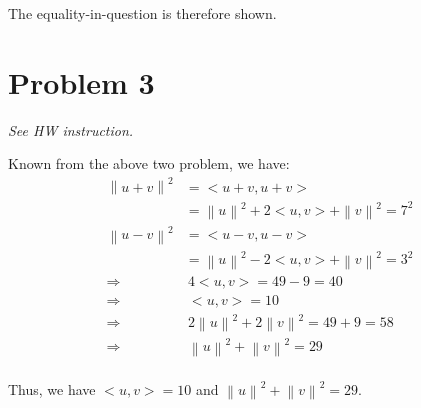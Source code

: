 \documentclass[11pt]{article}
\providecommand{\norm}[1]{\left\lVert #1 \right\rVert}
\begin{document}
The equality-in-question is therefore shown.

\section*{Problem 3}
\textit{See HW instruction.}\newline

Known from the above two problem, we have:
\begin{align*}
    \norm{u + v}^2 &= <u + v, u + v> \\
    &= \norm{u}^2 + 2<u, v> + \norm{v}^2 = 7^2 \\
    \norm{u - v}^2 &= <u - v, u - v> \\
    &= \norm{u}^2 - 2<u, v> + \norm{v}^2 = 3^2 \\
    \Rightarrow& \ 4<u, v> = 49 - 9 = 40 \\
    \Longrightarrow& \ <u, v> = 10 \\
    \Rightarrow& \ 2\norm{u}^2 + 2\norm{v}^2 = 49 + 9 = 58 \\
    \Longrightarrow& \ \norm{u}^2 + \norm{v}^2 = 29 \\
\end{align*}

Thus, we have $<u, v> = 10$ and $\norm{u}^2 + \norm{v}^2 = 29$.
\end{document}
